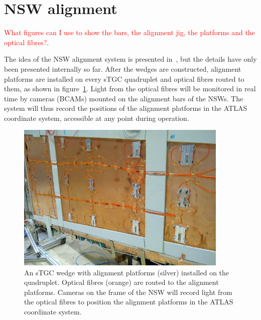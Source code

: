 \section{NSW alignment}
\label{sec:nsw_alignment}

\textcolor{red}{What figures can I use to show the bars, the alignment jig, the platforms and the optical fibres?}.

The idea of the NSW alignment system is presented in~\cite{nsw_tdr}, but the details have only been presented internally so far. After the wedges are constructed, alignment platforms are installed on every sTGC quadruplet and optical fibres routed to them, as shown in figure~\ref{fig:alignment_platforms}. Light from the optical fibres will be monitored in real time by cameras (BCAMs) mounted on the alignment bars of the NSWs. The system will thus record the positions of the alignment platforms in the ATLAS coordinate system, accessible at any point during operation. %

\begin{figure}
    \centering
    \includegraphics[width = 0.9\textwidth]{figures/alignment_platforms_lefebvre.png}
    \caption{An sTGC wedge with alignment platforms (silver) installed on the quadruplet. Optical fibres (orange) are routed to the alignment platforms. Cameras on the frame of the NSW will record light from the optical fibres to position the alignment platforms in the ATLAS coordinate system.}
    \label{fig:alignment_platforms}
\end{figure}


